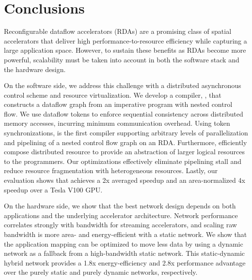 \chapter{Conclusions} \label{sec:conclusion}

Reconfigurable dataflow accelerators (RDAs) are a promising class of spatial accelerators that
deliver high performance-to-resource efficiency while capturing a large application space.
However, to sustain these benefits as RDAs become more powerful, scalability must be taken into account in both the software
stack and the hardware design.

On the software side, we address this challenge with a distributed asynchronous control scheme and resource
virtualization.
We develop a compiler, \name{}, that constructs a dataflow graph from an imperative program with nested
control flow. We use dataflow tokens to enforce sequential consistency across distributed memory
accesses, incurring minimum communication overhead.
Using token synchronizations, \name is the first compiler supporting arbitrary levels of parallelization and pipelining 
of a nested control flow graph on an RDA.
Furthermore, \name efficiently compose distributed resource to provide an abstraction of larger
logical resources to the programmers.
Our optimizations effectively eliminate pipelining stall and reduce resource fragmentation with
heterogeneous resources.
Lastly, our evaluation shows that \name{} achieves a 2x averaged speedup and an area-normalized 4x
speedup over a Tesla V100 GPU.

On the hardware side, we show that the best network design depends on both applications and the underlying accelerator architecture.
Network performance correlates strongly with bandwidth for streaming accelerators, and scaling raw bandwidth is more area- and energy-efficient with a static network.
We show that the application mapping can be optimized to move less data by using a dynamic network as a fallback from a high-bandwidth static network.
This static-dynamic hybrid network provides a 1.8x energy-efficiency and
2.8x performance advantage over the purely static and purely dynamic networks, respectively.


